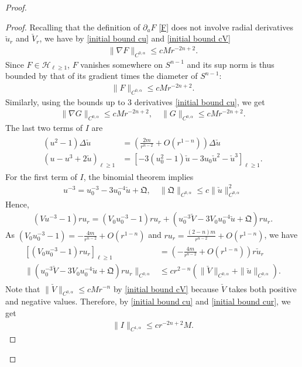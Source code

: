 \documentclass[12pt,twoside]{article}
\theoremstyle{plain}
\theoremstyle{definition}
\theoremstyle{remark}
\newcommand{\pl}{\partial}
\newcommand{\na}{\nabla}
\newcommand{\lt}{\left}
\newcommand{\rt}{\right}
\newcommand{\cu}{\check{u}}
\newcommand{\cV}{\check{V}}
\numberwithin{equation}{section}
\begin{document}
\begin{proof}
\begin{proof}
Recalling that the definition of $\pl_a F$ \eqref{F} does not involve radial derivatives $\check u_r$ and $\check V_r$, we have by \eqref{initial bound cu} and \eqref{initial bound cV}
\begin{align*}
\| \na F\|_{C^{0,\alpha}} \le c M r^{-2n+2}.
\end{align*}
Since $F \in \mathcal{H}_{\ell\ge 1}$, $F$ vanishes somewhere on $S^{n-1}$ and its sup norm is thus bounded by that of its gradient times the diameter of $S^{n-1}$:
\begin{align*}
\| F \|_{C^{0,\alpha}} \le c M r^{-2n+2}.
\end{align*}
Similarly, using the bounds up to 3 derivatives \eqref{initial bound cu}, we get \begin{align*}
\| \na G\|_{C^{0,\alpha}} \le cM r^{-2n+2} , \quad \| G \|_{C^{0,\alpha}} \le c M r^{-2n+2}.
\end{align*} 
The last two terms of $I$ are
\begin{align}\label{last 2 term of I}
\begin{split}
(u^2-1)\Delta \cu &= \lt( \frac{2m}{r^{n-2}} + O(r^{1-n}) \rt) \Delta \cu\\
(u - u^3 + 2\cu)_{\ell\ge 1} &= \lt[ -3(u_0^2-1) \cu - 3 u_0 \cu^2 - \cu^3 \rt]_{\ell\ge 1}.
\end{split} 
\end{align}
For the first term of $I$, the binomial theorem implies
\begin{align}
u^{-3} = u_0^{-3} - 3 u_0^{-4} \cu + \mathfrak{Q}, \quad \| \mathfrak{Q}\|_{C^{0,\alpha}} \le c \| \cu\|_{C^{0,\alpha}}^2 
\end{align}
Hence,
\begin{align*}
(Vu^{-3}-1)ru_r = (V_0 u_0^{-3}-1) ru_r + \lt( u_0^{-3} \cV - 3 V_0 u_0^{-4} \cu + \mathfrak{Q} \rt)ru_r.
\end{align*}
As $(V_0u_0^{-3}-1) = -\frac{4m}{r^{n-2}} + O(r^{1-n})$ and $ru_r =  \frac{(2-n)m}{r^{n-2}} + O(r^{1-n})$, we have
\begin{align}\label{first term of I}
\begin{split}
\lt[ (V_0 u_0^{-3}-1) ru_r \rt]_{\ell\ge 1} &= \lt( -\frac{4m}{r^{n-2}} + O(r^{1-n})\rt) r \cu_r \\
\| \lt( u_0^{-3} \cV - 3 V_0 u_0^{-4} \cu + \mathfrak{Q} \rt)ru_r \|_{C^{0,\alpha}} &\le c r^{2-n} ( \| \cV\|_{C^{0,\alpha}} + \| \cu \|_{C^{0,\alpha}}).
\end{split}
\end{align}
Note that $\| \cV \|_{C^{0,\alpha}} \le cM r^{-n}$  by \eqref{initial bound cV} because $\cV$ takes both positive and negative values. Therefore, by \eqref{initial bound cu} and \eqref{initial bound cur}, we get
\begin{align*}
\| I\|_{C^{1,\alpha}} \le c r^{-2n+2} M.
\end{align*}
\end{proof}


\end{proof}
\end{document}
